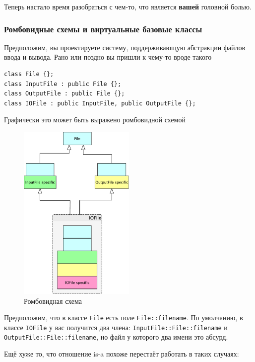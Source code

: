 \documentclass[a4paper,12pt,oneside]{article}
\begin{document}
Теперь настало время разобраться с чем-то, что является \textbf{вашей} головной болью.

\subsubsection{Ромбовидные схемы и виртуальные базовые классы}\label{RombSchemas}

Предположим, вы проектируете систему, поддерживающую абстракции файлов ввода и вывода. Рано или поздно вы пришли к чему-то вроде такого

\begin{lstlisting}
class File {};
class InputFile : public File {};
class OutputFile : public File {};
class IOFile : public InputFile, public OutputFile {};
\end{lstlisting}

Графически это может быть выражено ромбовидной схемой

\begin{figure}[h!]
\centering
\includegraphics[width=0.5\textwidth]{illustrations/romb-crop.pdf}
\caption{Ромбовидная схема}
\label{fig:romb-crop}
\end{figure}

Предположим, что в классе \lstinline!File! есть поле \lstinline!File::filename!. По умолчанию, в классе \lstinline!IOFile! у вас получится два члена: \lstinline!InputFile::File::filename! и \lstinline!OutputFile::File::filename!, но файл у которого два имени это абсурд. 

Ещё хуже то, что отношение is-a похоже перестаёт работать в таких случаях:
\end{document}
